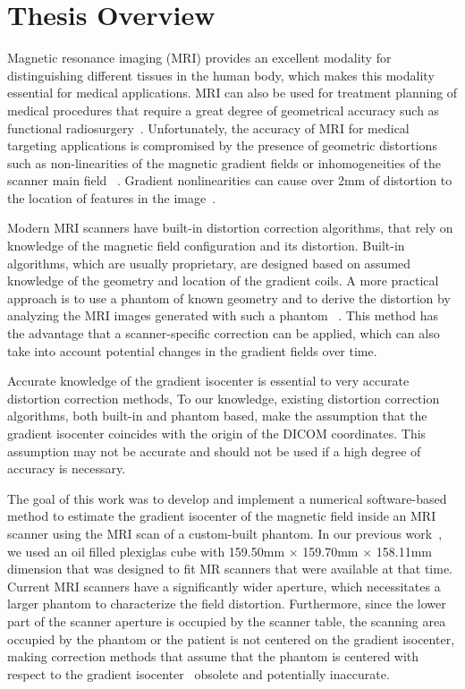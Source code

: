 \section{Thesis Overview}

Magnetic resonance imaging (MRI) provides an excellent modality for distinguishing different tissues 
in the human body, which makes 
this modality essential for medical applications. MRI can also be used for treatment planning of 
medical procedures that require a great degree of geometrical accuracy such as  
functional radiosurgery~\cite{Kond99}. Unfortunately, the accuracy of MRI for medical targeting applications 
is compromised by the presence of geometric distortions such as non-linearities of the magnetic gradient 
fields or inhomogeneities of the scanner main field 
~\cite{Dor05,LSS06a,LSS06b,LSS08a,LSS08b,Lang99,Wang04a,Wang04b}. 
Gradient nonlinearities can cause over 2mm of distortion to the location of features in the 
image~\cite{LSS08b,Lang99}.

Modern MRI scanners have built-in distortion correction algorithms, that rely on knowledge of the magnetic 
field configuration and its distortion. Built-in algorithms, which are usually proprietary, are designed 
based on assumed knowledge of the geometry and location of the gradient coils. A more practical approach is 
to use a phantom of known geometry and to derive the distortion by analyzing the MRI images generated with 
such a phantom ~\cite{Dor05,LSS06a,LSS06b,LSS08a,LSS08b,Lang99,Wang04a,Wang04b}. 
This method has the advantage that a scanner-specific correction can be applied, which can also take into 
account potential changes in the gradient fields over time.

Accurate knowledge of the gradient isocenter is essential to very accurate distortion correction methods, 
To our knowledge, existing distortion correction algorithms, both built-in and phantom based, 
make the assumption that the gradient isocenter coincides with the origin of the DICOM coordinates. 
This assumption may not be accurate and should not be used if a high degree of accuracy is necessary.

The goal of this work was to develop and implement a numerical software-based method to estimate the gradient 
isocenter of the magnetic field inside an MRI scanner using the MRI scan of a custom-built phantom.  
In our previous work~\cite{LSS06a,LSS06b,LSS08a,LSS08b}, we used an oil filled plexiglas cube with
159.50mm $\times$ 159.70mm $\times$ 158.11mm dimension that was designed to fit MR scanners that were 
available at that time.  Current MRI scanners have a significantly wider aperture, which necessitates 
a larger phantom to characterize the field distortion.  Furthermore, since the lower part of the scanner 
aperture is occupied by the scanner table, the scanning area occupied by the phantom or the patient is not 
centered on the gradient isocenter, making correction methods that assume that the phantom is centered with 
respect to the gradient isocenter~\cite{LSS06a,LSS06b,LSS08a,LSS08b,Lang99} obsolete and potentially 
inaccurate.

